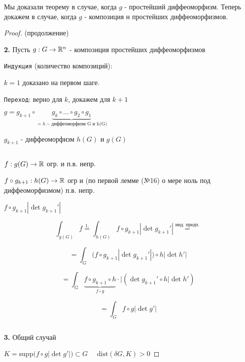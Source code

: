 

\usepackage{amsfonts, amssymb, amsmath, mathtools, amsthm}  %
\usepackage{mathrsfs}


\renewcommand{\baselinestretch}{1.3} 
\setcounter{lemma}{19}


    \null\hfill {}

    Мы доказали теорему в случае, когда $g$ - простейший диффеоморфизм.
    Теперь докажем в случае, когда $g$ - композиция н простейших диффеоморфизмов.
    
    \begin{proof} (продолжение)
        
        \textbf{2.} Пусть $g: G \to \mathbb{R}^n$ - композиция простейших диффеоморфизмов
        
        \texttt{Индукция} (количество композиций): 
        
        $k=1$  доказано на первом шаге.

        \texttt{Переход}: верно для $k$, докажем для $k+1$

        $g = g_{k+1}\circ \underbrace{g_k \circ \dotsc \circ g_2 \circ g_1}_{=h - \text{диффеоморфизм G и h(G)}}$

        $g_{k+1}$ - диффеоморфизм $h(G)$ и $g(G)$

        \par $ $

        $f: g(G) \to \mathbb{R} $ огр. и п.в. непр.

        $f\circ g_{k+1}:h(G) \to \mathbb{R}$ огр и (по первой лемме (№16) о мере ноль под диффеоморфизмом) п.в. непр.

        $f\circ g_{k+1} |\det g_{k+1}'|$ %

        $$\int_{g(G)} f \overset{1.}{=} \int_{h(G)} f \circ g_{k+1} | \det g_{k+1}'| \overset{\text{инд. предп.}}{=} $$

        $$= \int_G \big(f\circ g_{k+1} | \det g_{k+1}'|\big) \circ h |\det h'|$$

        $$= \int_G \underbrace{f\circ g_{k+1}\circ h}_{f \circ g} \cdot | (\det g_{k+1}' \circ h |\det h')$$

        $$=\int_G f \circ g |\det g'|$$

        \par $ $

        \textbf{3.} Общий случай

        $K = \text{supp}\big(f\circ g | \det g'|\big) \subset G \quad $
        $\text{dist}(\delta G, K) > 0$


\end{proof}
